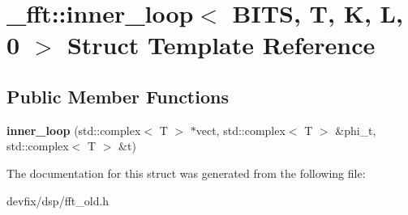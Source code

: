 \hypertarget{struct__fft_1_1inner__loop_3_01BITS_00_01T_00_01K_00_01L_00_010_01_4}{}\section{\+\_\+fft\+:\+:inner\+\_\+loop$<$ B\+I\+TS, T, K, L, 0 $>$ Struct Template Reference}
\label{struct__fft_1_1inner__loop_3_01BITS_00_01T_00_01K_00_01L_00_010_01_4}
\subsection*{Public Member Functions}
\begin{DoxyCompactItemize}
\item 
\mbox{\label{struct__fft_1_1inner__loop_3_01BITS_00_01T_00_01K_00_01L_00_010_01_4_a6d60ab833b554b5c78aaa7d8eb44e557}} 
{\bfseries inner\+\_\+loop} (std\+::complex$<$ T $>$ $\ast$vect, std\+::complex$<$ T $>$ \&phi\+\_\+t, std\+::complex$<$ T $>$ \&t)
\end{DoxyCompactItemize}


The documentation for this struct was generated from the following file\+:\begin{DoxyCompactItemize}
\item 
devfix/dsp/fft\+\_\+old.\+h\end{DoxyCompactItemize}
